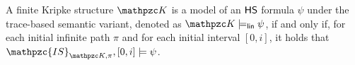 \begin{definition}
A finite Kripke structure $\Ku$ is a model of an $\text{\sffamily HS}$ formula $\psi$ under the trace-based semantic variant, denoted as $\Ku\models_\LinearTime \psi$, if and only if,
for each initial infinite path $\pi$  and for each initial interval $[0,i]$, it holds that  $\mathpzc{IS}_{\Ku,\pi},[0,i]\models \psi$. 
\end{definition}
